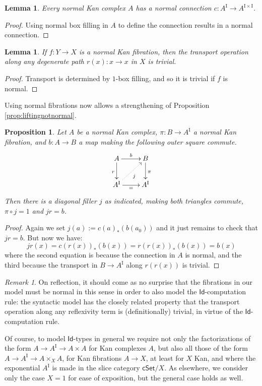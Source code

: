 \documentclass[12pt]{article}
\newcommand{\cSet}{\ensuremath{\mathsf{cSet}}}
\newcommand{\I}{\ensuremath{\mathrm{I}}}
\newcommand{\pA}{\ensuremath{A^\I}}
\newcommand{\Id}{\ensuremath{\mathsf{Id}}}
\newtheorem{proposition}[theorem]{Proposition}
\newtheorem{lemma}[theorem]{Lemma}
\theoremstyle{remark}
\newtheorem{remark}[theorem]{Remark}
\theoremstyle{definition}
\begin{document}
\begin{lemma}
Every normal Kan complex  $A$ has a normal connection $c : A^\I \to A^{\I\times\I}$.
\end{lemma}
\begin{proof}
Using normal box filling in $A$ to define the connection results in a normal connection.
\end{proof}

\begin{lemma}
If $f: Y\to X$ is a normal Kan fibration, then the transport operation along any degenerate path $r(x) : x\to x$ in $X$ is trivial.
\end{lemma}
\begin{proof}
Transport is determined by $1$-box filling, and so it is trivial if $f$ is normal.
\end{proof}

Using normal fibrations now allows a strengthening of Proposition \ref{prop:liftingnotnormal}.

\begin{proposition}\label{prop:liftingnormal}
Let $A$ be a normal Kan complex, $\pi : B \to A^\I$ a normal Kan fibration, and $b : A\to B$ a map making the following outer square commute.
\begin{equation}\label{diagram:IdElim}
\xymatrix{
A \ar[d]_{r} \ar[r]^{b} & \ar[d]^{\pi} B \\
A^\I \ar@{..>}[ru]_{j} \ar[r]_{=} & A^\I
}
\end{equation}
Then there is a diagonal filler $j$ as indicated, making both triangles commute, $\pi\circ j = 1$ and $jr=b$.
\end{proposition}
\begin{proof}
Again we set $j(a) := c(a)_*(b(a_0))$ and it just remains to check that $jr=b$.  But now we have:
\[
jr(x) = c(r(x))_*(b(x)) = r(r(x))_*(b(x)) = b(x)
\]
where the second equation is because the connection in $A$ is normal, and the third because the transport in $B\to\pA$ along $r(r(x))$ is trivial.
\end{proof}

\begin{remark}
On reflection, it should come as no surprise that the fibrations in our model must be normal in this sense in order to also model the \Id-computation rule: the syntactic model has the closely related property that the transport operation along any reflexivity term is (definitionally) trivial, in virtue of the \Id-computation rule.

Of course, to model \Id-types in general we require not only the factorizations of the form $A \to A^\I \to A\times A$ for Kan complexes $A$, but also all those of the form $A \to A^\I \to A\times_X A$, for Kan fibrations $A\to X$, at least for $X$ Kan, and where the exponential $A^\I$ is made in the slice category $\cSet/X$.  As elsewhere, we consider only the case $X=1$ for ease of exposition, but the general case holds as well.
\end{remark}
\end{document}
